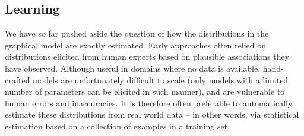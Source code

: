 

\subsection{Learning} 
\label{sec:learning}

We have so far pushed aside the question of how the distributions in the graphical model are exactly estimated.  Early approaches often relied on distributions elicited from human experts based on plausible associations they have observed.  Although useful in domains where no data is available, hand-crafted models are unfortunately difficult to scale (only models with a limited number of parameters can be elicited in such manner), and are vulnerable to human errors and inaccuracies. It is therefore often preferable to automatically estimate these distributions from real world data -- in other words, via statistical estimation based on a collection of examples in a training set. 

